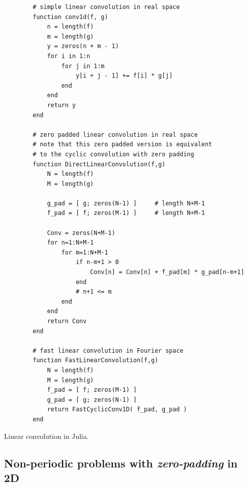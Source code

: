 \begin{codebox}
    \begin{verbatim}
        # simple linear convolution in real space
        function conv1d(f, g)
            n = length(f)
            m = length(g)
            y = zeros(n + m - 1)
            for i in 1:n
                for j in 1:m
                    y[i + j - 1] += f[i] * g[j]
                end
            end
            return y
        end

        # zero padded linear convolution in real space
        # note that this zero padded version is equivalent
        # to the cyclic convolution with zero padding
        function DirectLinearConvolution(f,g)
            N = length(f)
            M = length(g)

            g_pad = [ g; zeros(N-1) ]     # length N+M-1
            f_pad = [ f; zeros(M-1) ]     # length N+M-1

            Conv = zeros(N+M-1)
            for n=1:N+M-1
                for m=1:N+M-1
                    if n-m+1 > 0
                        Conv[n] = Conv[n] + f_pad[m] * g_pad[n-m+1]
                    end
                    # n+1 <= m
                end
            end
            return Conv
        end

        # fast linear convolution in Fourier space
        function FastLinearConvolution(f,g)
            N = length(f)
            M = length(g)
            f_pad = [ f; zeros(M-1) ]     
            g_pad = [ g; zeros(N-1) ]     
            return FastCyclicConv1D( f_pad, g_pad )
        end
    \end{verbatim}
    \caption{Linear convolution in Julia.}
    \label{code:linear_convolution}
\end{codebox}

\subsection{Non-periodic problems with \textit{zero-padding} in 2D}


